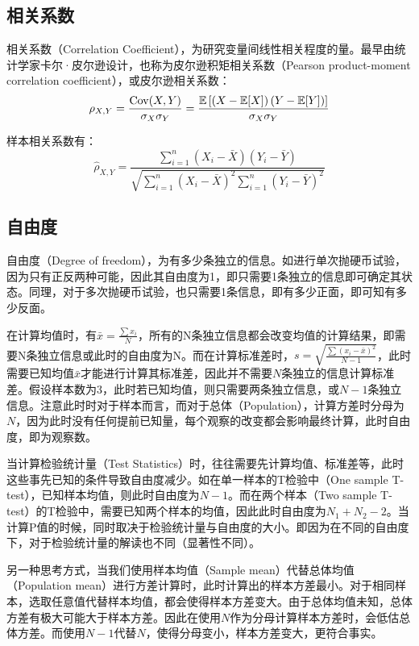 \documentclass[11pt]{article}
\begin{document}
\subsection{相关系数}

相关系数（Correlation Coefficient），为研究变量间线性相关程度的量。最早由统计学家卡尔·皮尔逊设计，也称为皮尔逊积矩相关系数（Pearson product-moment correlation coefficient），或皮尔逊相关系数：
\begin{equation*}
    \rho_{X,Y} = \frac{\operatorname{Cov}(X,Y)}{\sigma_X\sigma_Y}
    = \frac{\mathbb{E}\left[\left(X-\mathbb{E}[X]\right)\left(Y-\mathbb{E}[Y]\right)\right]}{\sigma_X\sigma_Y}
\end{equation*}

样本相关系数有：
\begin{equation*}
    \hat{\rho}_{X,Y} = \frac{\sum_{i=1}^{n}\left(X_i - \bar{X}\right)\left(Y_i - \bar{Y}\right)}{\sqrt{\sum_{i=1}^{n}\left(X_i - \bar{X}\right)^2 \sum_{i=1}^{n}\left(Y_i - \bar{Y}\right)^2}}
\end{equation*}

\subsection{自由度}

自由度（Degree of freedom），为有多少条独立的信息。如进行单次抛硬币试验，因为只有正反两种可能，因此其自由度为1，即只需要1条独立的信息即可确定其状态。同理，对于多次抛硬币试验，也只需要1条信息，即有多少正面，即可知有多少反面。

在计算均值时，有$\bar{x} = \tfrac{\sum x_i}{N}$，所有的N条独立信息都会改变均值的计算结果，即需要N条独立信息或此时的自由度为N。而在计算标准差时，$s = \sqrt{\frac{\sum (x_i - \bar{x})^2}{N-1}}$，此时需要已知均值$\bar{x}$才能进行计算其标准差，因此并不需要$N$条独立的信息计算标准差。假设样本数为3，此时若已知均值，则只需要两条独立信息，或$N-1$条独立信息。注意此时时对于样本而言，而对于总体（Population），计算方差时分母为$N$，因为此时没有任何提前已知量，每个观察的改变都会影响最终计算，此时自由度，即为观察数。

当计算检验统计量（Test Statistics）时，往往需要先计算均值、标准差等，此时这些事先已知的条件导致自由度减少。如在单一样本的T检验中（One sample T-test），已知样本均值，则此时自由度为$N-1$。而在两个样本（Two sample T-test）的T检验中，需要已知两个样本的均值，因此此时自由度为$N_1 + N_2 - 2$。当计算P值的时候，同时取决于检验统计量与自由度的大小。即因为在不同的自由度下，对于检验统计量的解读也不同（显著性不同）。

另一种思考方式，当我们使用样本均值（Sample mean）代替总体均值（Population mean）进行方差计算时，此时计算出的样本方差最小。对于相同样本，选取任意值代替样本均值，都会使得样本方差变大。由于总体均值未知，总体方差有极大可能大于样本方差。因此在使用$N$作为分母计算样本方差时，会低估总体方差。而使用$N-1$代替$N$，使得分母变小，样本方差变大，更符合事实。
\end{document}
